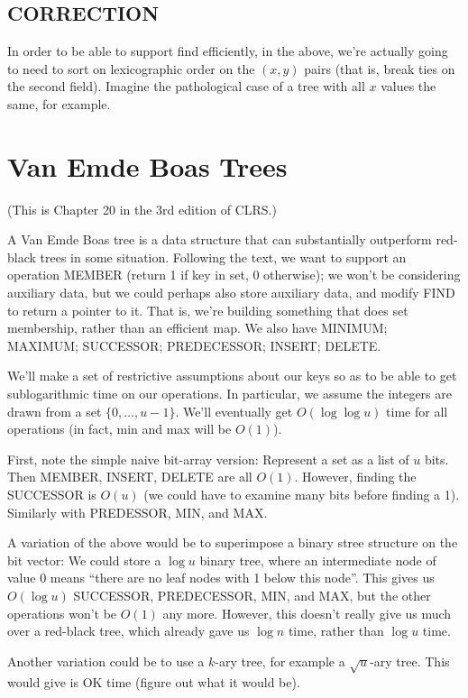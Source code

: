 \documentclass{article}
\begin{document}
\subsection{CORRECTION}

In order to be able to support find efficiently, in the above, we're actually
going to need to sort on lexicographic order on the $(x,y)$ pairs (that is,
break ties on the second field).
Imagine the pathological case of a tree with all $x$ values the same, for
example.


\section{Van Emde Boas Trees}

(This is Chapter 20 in the 3rd edition of CLRS.)

A Van Emde Boas tree is a data structure that can substantially outperform
red-black trees in some situation.
Following the text, we want to support an operation MEMBER (return 1 if
key in set, 0 otherwise); we won't be considering auxiliary data,
but we could perhaps also store auxiliary data, and modify FIND to return a 
pointer to it.
That is, we're building something that does set membership, rather than
an efficient map.
We also have MINIMUM; MAXIMUM; SUCCESSOR; PREDECESSOR;
INSERT; DELETE.

We'll make a set of restrictive assumptions about our keys so as to be able to 
get sublogarithmic time on our operations.
In particular, we assume the integers are drawn from a set $\{0,\ldots,u-1\}$.
We'll eventually get $O(\log\log u)$ time for all operations (in fact,
min and max will be $O(1)$).

First, note the simple naive bit-array version: Represent a set as a list of
$u$ bits. Then
MEMBER, INSERT, DELETE are all $O(1)$.
However, finding the SUCCESSOR is $O(u)$ (we could have to examine many bits
before finding a 1).
Similarly with PREDESSOR, MIN, and MAX.

A variation of the above would be to superimpose a binary stree structure
on the bit vector: We could store a $\log u$ binary tree, where
an intermediate node of value 0 means ``there are no leaf nodes with 1 below
this node''.
This gives us $O(\log u)$ SUCCESSOR, PREDECESSOR, MIN, and MAX, but
the other operations won't be $O(1)$ any more.
However, this doesn't really give us much over a red-black tree, which
already gave us $\log n$ time, rather than $\log u$ time.

Another variation could be to use a $k$-ary tree, for example a
$\sqrt u$-ary tree.
This would give is OK time (figure out what it would be).
\end{document}
